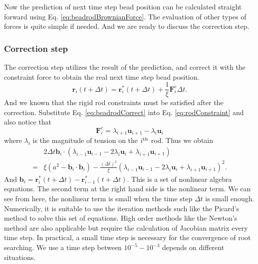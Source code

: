 Now the prediction of next time step bead position can be calculated straight forward using Eq. \eqref{eq:beadrodBrownianForce}. The evaluation of other types of forces is quite simple if needed. And we are ready to discuss the correction step.

\subsubsection{Correction step}
The correction step utilizes the result of the prediction, and correct it with the constraint force to obtain the real next time step bead position. 
\begin{equation}
    \label{eq:beadrodCorrect}
    \mathbf{r}_i(t+\Delta t) = \mathbf{r}_i^*(t+\Delta t) + \frac{1}{\xi}\mathbf{F}_i^{c}\Delta t.
\end{equation}
And we known that the rigid rod constraints must be satisfied after the correction. Substitute Eq. \eqref{eq:beadrodCorrect} into Eq. \eqref{eq:rodConstraint} and also notice that 
\begin{equation}
    \label{eq:tensionRod}
    \mathbf{F}_i^{c} = \lambda_{i+1}\mathbf{u}_{i+1} - \lambda_{i}\mathbf{u}_{i}
\end{equation}
where $\lambda_i$ is the magnitude of tension on the $i^{\rm{th}}$ rod. Thus we obtain
\begin{equation}
    \begin{aligned}
    \label{eq:rodTensionEq}
    & 2\Delta t\mathbf{b}_i\cdot\left(\lambda_{i-1}\mathbf{u}_{i-1}-2\lambda_i\mathbf{u}_i+\lambda_{i+1}\mathbf{u}_{i+1}\right) \\
    = &\xi\left(a^2 - \mathbf{b}_i\cdot\mathbf{b}_i\right) -\frac{(\Delta t)^2}{\xi}\left(\lambda_{i-1}\mathbf{u}_{i-1}-2\lambda_i\mathbf{u}_i+\lambda_{i+1}\mathbf{u}_{i+1}\right)^2.
    \end{aligned}
\end{equation}
And $\mathbf{b}_i = \mathbf{r}_i^*(t+\Delta t)- \mathbf{r}_{i-1}^*(t+\Delta t)$. This is a set of nonlinear algebra equations. The second term at the right hand side is the nonlinear term. We can see from here, the nonlinear term is small when the time step $\Delta t$ is small enough. Numerically, it is suitable to use the iteration methods such like the Picard's method to solve this set of equations. High order methods like the Newton's method are also applicable but require the calculation of Jacobian matrix every time step. In practical, a small time step is necessary for the convergence of root searching. We use a time step between $10^{-5}-10^{-3}$ depends on different situations. 


